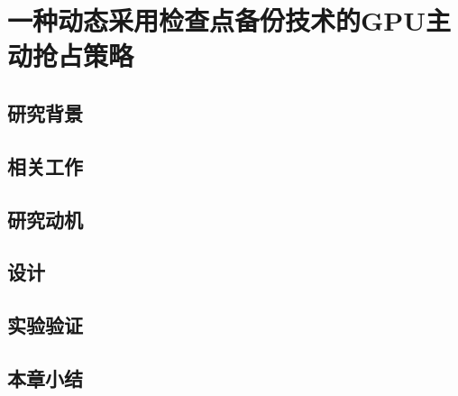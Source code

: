 \chapter{一种动态采用检查点备份技术的GPU主动抢占策略}
\label{chap:PEP}

\section{研究背景}

\section{相关工作}

\section{研究动机}


\section{设计}

\section{实验验证}

\section{本章小结}

